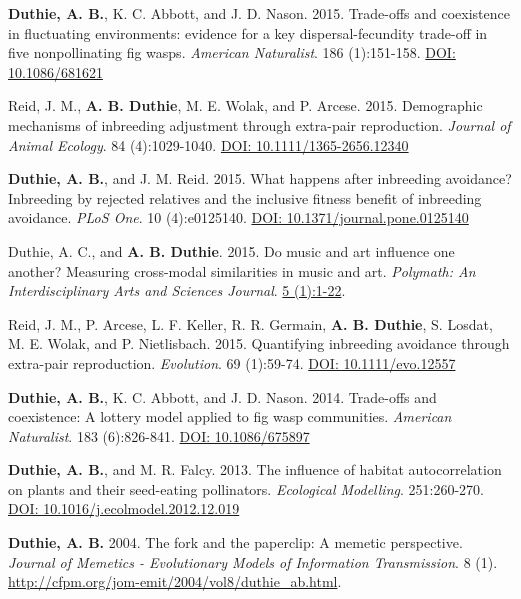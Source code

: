 \documentclass[letterpaper]{article}
\begin{document}
\begin{etaremune}
\item {\bf Duthie, A. B.}, K. C. Abbott, and J. D. Nason. 2015. Trade-offs and coexistence in fluctuating environments: evidence for a key dispersal-fecundity trade-off in five nonpollinating fig wasps. {\it American Naturalist}. 186 (1):151-158. \href{http://www.jstor.org/stable/10.1086/681621}{DOI: 10.1086/681621}
\item Reid, J. M., {\bf A. B. Duthie}, M. E. Wolak, and P. Arcese. 2015. Demographic mechanisms of inbreeding adjustment through extra-pair reproduction. {\it Journal of Animal Ecology}. 84 (4):1029-1040. \href{http://onlinelibrary.wiley.com/doi/10.1111/1365-2656.12340/abstract}{DOI: 10.1111/1365-2656.12340}
\item {\bf Duthie, A. B.}, and J. M. Reid. 2015. What happens after inbreeding avoidance? Inbreeding by rejected relatives and the inclusive fitness benefit of inbreeding avoidance. {\it PLoS One}. 10 (4):e0125140. \href{http://journals.plos.org/plosone/article?id=10.1371/journal.pone.0125140}{DOI: 10.1371/journal.pone.0125140}
\item Duthie, A. C., and {\bf A. B. Duthie}. 2015. Do music and art influence one another? Measuring cross-modal similarities in music and art. {\it Polymath: An Interdisciplinary Arts and Sciences Journal}. \href{https://ojcs.siue.edu/ojs/index.php/polymath/article/view/3013}{5 (1):1-22}.
\item Reid, J. M., P. Arcese, L. F. Keller, R. R. Germain, {\bf A. B. Duthie}, S. Losdat, M. E. Wolak, and P. Nietlisbach. 2015. Quantifying inbreeding avoidance through extra-pair reproduction. {\it Evolution}. 69 (1):59-74. \href{http://onlinelibrary.wiley.com/doi/10.1111/evo.12557/abstract}{DOI: 10.1111/evo.12557}
\item {\bf Duthie, A. B.}, K. C. Abbott, and J. D. Nason. 2014. Trade-offs and coexistence: A lottery model applied to fig wasp communities. {\it American Naturalist}. 183 (6):826-841. \href{http://www.jstor.org/stable/10.1086/675897}{DOI: 10.1086/675897}
\item {\bf Duthie, A. B.}, and M. R. Falcy. 2013. The influence of habitat autocorrelation on plants and their seed-eating pollinators. {\it Ecological Modelling}. 251:260-270. \href{http://www.sciencedirect.com/science/article/pii/S0304380013000021}{DOI: 10.1016/j.ecolmodel.2012.12.019}
\item {\bf Duthie, A. B.} 2004. The fork and the paperclip: A memetic perspective. {\it Journal of Memetics - Evolutionary Models of Information Transmission}. 8 (1). \href{http://cfpm.org/jom-emit/2004/vol8/duthie_ab.html}{http://cfpm.org/jom-emit/2004/vol8/duthie\_ab.html}.
\end{etaremune}
\end{document}
